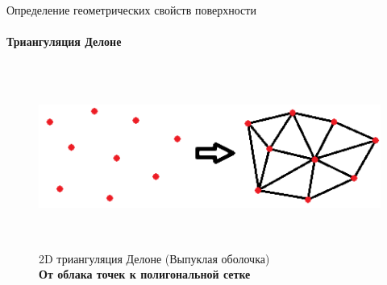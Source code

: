 \documentclass[aspectratio=169,xcolor=table,10pt]{beamer}
\begin{document}
\begin{frame}[t]{Определение геометрических свойств поверхности}
    \framesubtitle{Триангуляция Делоне}
    \vspace{-0.2cm}
    \begin{figure}[H]
        \centering\includegraphics[height=6cm,width=1\textwidth,keepaspectratio]{delone_idea.png}
        \caption*{2D триангуляция Делоне (Выпуклая оболочка) \\ \textbf{От облака точек к полигональной сетке}}
        \label{fig:delone_idea.png}
    \end{figure}
\end{frame}
\end{document}
